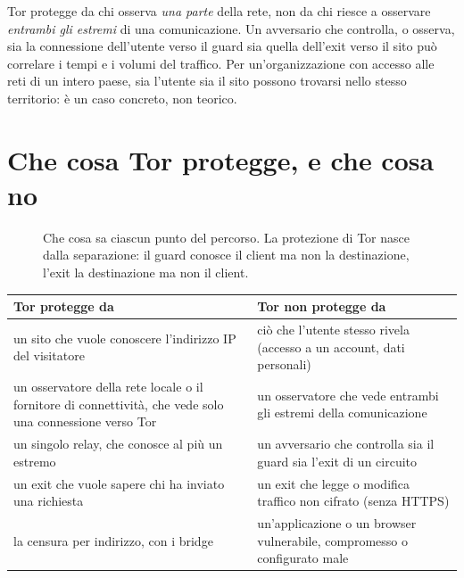 \begin{attenzione}
Tor protegge da chi osserva \emph{una parte} della rete, non da chi riesce a osservare \emph{entrambi gli estremi} di una comunicazione. Un avversario che controlla, o osserva, sia la connessione dell'utente verso il guard sia quella dell'exit verso il sito può correlare i tempi e i volumi del traffico. Per un'organizzazione con accesso alle reti di un intero paese, sia l'utente sia il sito possono trovarsi nello stesso territorio: è un caso concreto, non teorico.
\end{attenzione}

\section{Che cosa Tor protegge, e che cosa no}\label{sec:minaccia-sintesi}

\begin{figure}[htbp]
\centering

\caption{Che cosa sa ciascun punto del percorso. La protezione di Tor nasce dalla separazione: il guard conosce il client ma non la destinazione, l'exit la destinazione ma non il client.}
\label{fig:sapere}
\end{figure}

\begin{center}\small
\begin{tabularx}{\textwidth}{@{}>{\raggedright\arraybackslash}X>{\raggedright\arraybackslash}X@{}}
\toprule
Tor protegge da & Tor non protegge da \\
\midrule
un sito che vuole conoscere l'indirizzo IP del visitatore & ciò che l'utente stesso rivela (accesso a un account, dati personali) \\
un osservatore della rete locale o il fornitore di connettività, che vede solo una connessione verso Tor & un osservatore che vede entrambi gli estremi della comunicazione \\
un singolo relay, che conosce al più un estremo & un avversario che controlla sia il guard sia l'exit di un circuito \\
un exit che vuole sapere chi ha inviato una richiesta & un exit che legge o modifica traffico non cifrato (senza HTTPS) \\
la censura per indirizzo, con i bridge & un'applicazione o un browser vulnerabile, compromesso o configurato male \\
\bottomrule
\end{tabularx}
\end{center}

